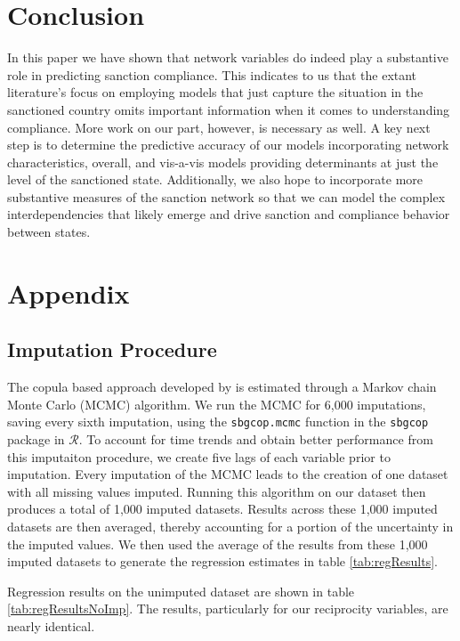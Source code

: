 \section*{Conclusion}
\label{conclusion}

In this paper we have shown that network variables do indeed play a substantive role in predicting sanction compliance. This indicates to us that the extant literature's focus on employing models that just capture the situation in the sanctioned country omits important information when it comes to understanding compliance. More work on our part, however, is necessary as well. A key next step is to determine the predictive accuracy of our models incorporating network characteristics, overall, and vis-a-vis models providing determinants at just the level of the sanctioned state. Additionally, we also hope to incorporate more substantive measures of the sanction network so that we can model the complex interdependencies that likely emerge and drive sanction and compliance behavior between states. 


\newpage
\section*{Appendix}
\label{appendix}

\subsection*{Imputation Procedure}

The copula based approach developed by \citet{hoff:2007} is estimated through a Markov chain Monte Carlo (MCMC) algorithm. We run the MCMC for 6,000 imputations, saving every sixth imputation, using the \texttt{sbgcop.mcmc} function in the \texttt{sbgcop} package in $\mathcal{R}$. To account for time trends and obtain better performance from this imputaiton procedure, we create five lags of each variable prior to imputation. Every imputation of the MCMC leads to the creation of one dataset with all missing values imputed. Running this algorithm on our dataset then produces a total of 1,000 imputed datasets. Results across these 1,000 imputed datasets are then averaged, thereby accounting for a portion of the uncertainty in the imputed values. We then used the average of the results from these 1,000 imputed datasets to generate the regression estimates in table \ref{tab:regResults}. 

Regression results on the unimputed dataset are shown in table \ref{tab:regResultsNoImp}. The results, particularly for our reciprocity variables, are nearly identical. 


\FloatBarrier